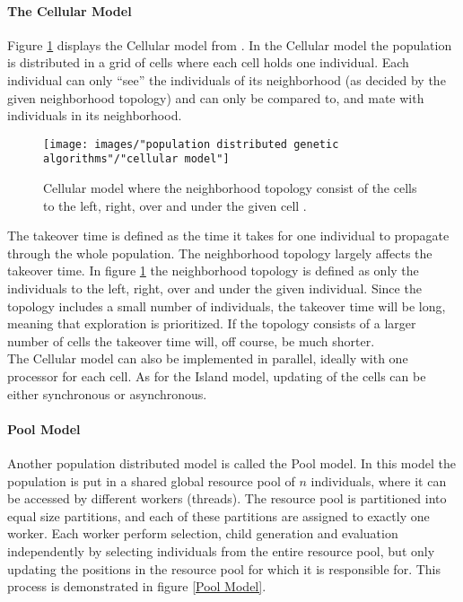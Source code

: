\paragraph*{The Cellular Model}
Figure \ref{Cellular model} displays the Cellular model from \cite{Gong}. In the Cellular model the population is distributed in a grid of cells where each cell holds one individual. Each individual can only ``see'' the individuals of its neighborhood (as decided by the given neighborhood topology) and can only be compared to, and mate with individuals in its neighborhood. \\


\begin{figure}[h!]
\begin{center}
\texttt{[image: images/"population distributed genetic algorithms"/"cellular model"]}
\caption{Cellular model where the neighborhood topology consist of the cells to the left, right, over and under the given cell \citep{Gong}.}
\label{Cellular model}
\end{center}
\end{figure}


\noindent The takeover time is defined as the time it takes for one individual to propagate through the whole population. The neighborhood topology largely affects the takeover time. In figure \ref{Cellular model} the neighborhood topology is defined as only the individuals to the left, right, over and under the given individual. Since the topology includes a small number of individuals, the takeover time will be long, meaning that exploration is prioritized. If the topology consists of a larger number of cells the takeover time will, off course, be much shorter.\\


\noindent The Cellular model can also be implemented in parallel, ideally with one processor for each cell. As for the Island model, updating of the cells can be either synchronous or asynchronous.


\paragraph*{Pool Model}
Another population distributed model is called the Pool model. In this model the population is put in a shared global resource pool of $n$ individuals, where it can be accessed by different workers (threads). The resource pool is partitioned into equal size partitions, and each of these partitions are assigned to exactly one worker. Each worker perform selection, child generation and evaluation independently by selecting individuals from the entire resource pool, but only updating the positions in the resource pool for which it is responsible for. This process is demonstrated in figure \ref{Pool Model}. \\


